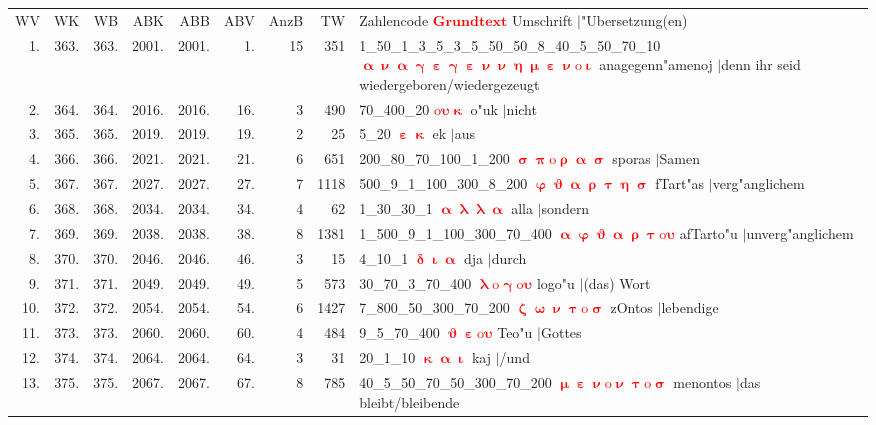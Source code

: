 \documentclass[a4paper,10pt,landscape]{article}
\begin{document}
\begin{tabular}{rrrrrrrrp{120mm}}
WV&WK&WB&ABK&ABB&ABV&AnzB&TW&Zahlencode \textcolor{red}{$\boldsymbol{Grundtext}$} Umschrift $|$"Ubersetzung(en)\\
1.&363.&363.&2001.&2001.&1.&15&351&1\_50\_1\_3\_5\_3\_5\_50\_50\_8\_40\_5\_50\_70\_10 \textcolor{red}{$\boldsymbol{\upalpha\upnu\upalpha\upgamma\upepsilon\upgamma\upepsilon\upnu\upnu\upeta\upmu\upepsilon\upnu\mathrm{o}\upiota}$} anagegenn"amenoj $|$denn ihr seid wiedergeboren/wiedergezeugt\\
2.&364.&364.&2016.&2016.&16.&3&490&70\_400\_20 \textcolor{red}{$\boldsymbol{\mathrm{o}\upsilon\upkappa}$} o"uk $|$nicht\\
3.&365.&365.&2019.&2019.&19.&2&25&5\_20 \textcolor{red}{$\boldsymbol{\upepsilon\upkappa}$} ek $|$aus\\
4.&366.&366.&2021.&2021.&21.&6&651&200\_80\_70\_100\_1\_200 \textcolor{red}{$\boldsymbol{\upsigma\uppi\mathrm{o}\uprho\upalpha\upsigma}$} sporas $|$Samen\\
5.&367.&367.&2027.&2027.&27.&7&1118&500\_9\_1\_100\_300\_8\_200 \textcolor{red}{$\boldsymbol{\upvarphi\upvartheta\upalpha\uprho\uptau\upeta\upsigma}$} fTart"as $|$verg"anglichem\\
6.&368.&368.&2034.&2034.&34.&4&62&1\_30\_30\_1 \textcolor{red}{$\boldsymbol{\upalpha\uplambda\uplambda\upalpha}$} alla $|$sondern\\
7.&369.&369.&2038.&2038.&38.&8&1381&1\_500\_9\_1\_100\_300\_70\_400 \textcolor{red}{$\boldsymbol{\upalpha\upvarphi\upvartheta\upalpha\uprho\uptau\mathrm{o}\upsilon}$} afTarto"u $|$unverg"anglichem\\
8.&370.&370.&2046.&2046.&46.&3&15&4\_10\_1 \textcolor{red}{$\boldsymbol{\updelta\upiota\upalpha}$} dja $|$durch\\
9.&371.&371.&2049.&2049.&49.&5&573&30\_70\_3\_70\_400 \textcolor{red}{$\boldsymbol{\uplambda\mathrm{o}\upgamma\mathrm{o}\upsilon}$} logo"u $|$(das) Wort\\
10.&372.&372.&2054.&2054.&54.&6&1427&7\_800\_50\_300\_70\_200 \textcolor{red}{$\boldsymbol{\upzeta\upomega\upnu\uptau\mathrm{o}\upsigma}$} zOntos $|$lebendige\\
11.&373.&373.&2060.&2060.&60.&4&484&9\_5\_70\_400 \textcolor{red}{$\boldsymbol{\upvartheta\upepsilon\mathrm{o}\upsilon}$} Teo"u $|$Gottes\\
12.&374.&374.&2064.&2064.&64.&3&31&20\_1\_10 \textcolor{red}{$\boldsymbol{\upkappa\upalpha\upiota}$} kaj $|$/und\\
13.&375.&375.&2067.&2067.&67.&8&785&40\_5\_50\_70\_50\_300\_70\_200 \textcolor{red}{$\boldsymbol{\upmu\upepsilon\upnu\mathrm{o}\upnu\uptau\mathrm{o}\upsigma}$} menontos $|$das bleibt/bleibende\\

\end{tabular}
\end{document}
